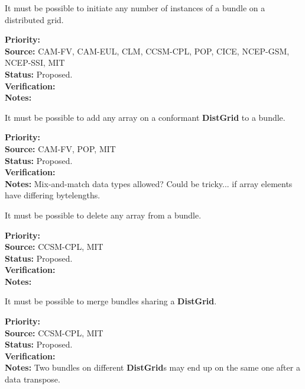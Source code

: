 
It must be possible to initiate any number of instances of a bundle on
a distributed grid.

\begin{reqlist}
{\bf Priority:} \\ 
{\bf Source:} CAM-FV, CAM-EUL, CLM, CCSM-CPL, POP, CICE, NCEP-GSM, NCEP-SSI, MIT \\
{\bf Status:} Proposed. \\
{\bf Verification:} \\
{\bf Notes:}
\end{reqlist}


It must be possible to add any array on a conformant \textbf{DistGrid}
to a bundle.

\begin{reqlist}
{\bf Priority:} \\ 
{\bf Source:} CAM-FV, POP, MIT \\
{\bf Status:} Proposed. \\
{\bf Verification:} \\
{\bf Notes:} Mix-and-match data types allowed? Could be tricky... if
  array elements have differing bytelengths.
\end{reqlist}


It must be possible to delete any array from a bundle.

\begin{reqlist}
{\bf Priority:} \\
{\bf Source:} CCSM-CPL, MIT \\
{\bf Status:} Proposed. \\
{\bf Verification:} \\
{\bf Notes:}
\end{reqlist}


It must be possible to merge bundles sharing a \textbf{DistGrid}.

\begin{reqlist}
{\bf Priority:} \\
{\bf Source:} CCSM-CPL, MIT \\
{\bf Status:} Proposed. \\
{\bf Verification:} \\
{\bf Notes:} Two bundles on different \textbf{DistGrid}s may end up on the same
  one after a data transpose.
\end{reqlist}

